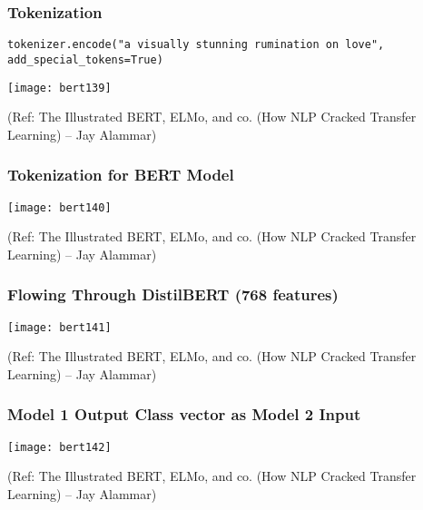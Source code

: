 \begin{frame}[fragile]\frametitle{ Tokenization}

\lstinline|tokenizer.encode("a visually stunning rumination on love", add_special_tokens=True)|


			\begin{center}
			\texttt{[image: bert139]}
			\end{center}	

{\tiny (Ref: The Illustrated BERT, ELMo, and co. (How NLP Cracked Transfer Learning) – Jay Alammar)}

\end{frame}

\begin{frame}[fragile]\frametitle{ Tokenization for BERT Model}

			\begin{center}
			\texttt{[image: bert140]}
			\end{center}	

{\tiny (Ref: The Illustrated BERT, ELMo, and co. (How NLP Cracked Transfer Learning) – Jay Alammar)}

\end{frame}

\begin{frame}[fragile]\frametitle{ Flowing Through DistilBERT (768 features)}

			\begin{center}
			\texttt{[image: bert141]}
			\end{center}	

{\tiny (Ref: The Illustrated BERT, ELMo, and co. (How NLP Cracked Transfer Learning) – Jay Alammar)}

\end{frame}

\begin{frame}[fragile]\frametitle{ Model 1 Output Class vector as Model 2 Input}

			\begin{center}
			\texttt{[image: bert142]}
			\end{center}	

{\tiny (Ref: The Illustrated BERT, ELMo, and co. (How NLP Cracked Transfer Learning) – Jay Alammar)}

\end{frame}

